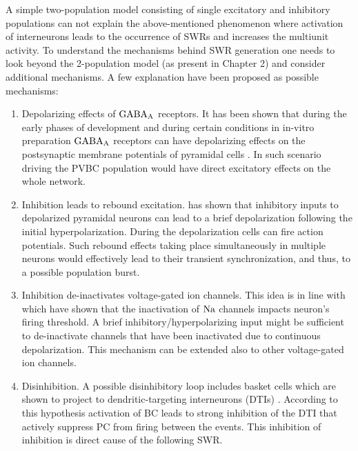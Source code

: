     A simple two-population model consisting of single excitatory and
    inhibitory populations can not explain the above-mentioned phenomenon where
    activation of interneurons leads to the occurrence of SWRs and increases
    the multiunit activity. To understand the mechanisms behind SWR generation
    one needs to look beyond the 2-population model (as present in Chapter 2)
    and consider additional mechanisms. A few explanation have been proposed as
    possible mechanisms:
    \begin{enumerate}
      \item Depolarizing effects of $\rm GABA_A$ receptors. It has been shown
        that during the early phases of development and during certain
        conditions in in-vitro preparation $\rm GABA_A$ receptors can have
        depolarizing effects on the postsynaptic membrane potentials of
        pyramidal cells \citep{Cohen2002, Gulledge2003, Banke2006,
        Szabadics2006}. In such scenario driving the PVBC population would have
        direct excitatory effects on the whole network.
      \item Inhibition leads to rebound excitation. \cite{Cobb95} has shown
        that inhibitory inputs to depolarized pyramidal neurons can lead to a
        brief depolarization following the initial hyperpolarization. During
        the depolarization cells can fire action potentials. Such rebound
        effects taking place simultaneously in multiple neurons would
        effectively lead to their transient synchronization, and thus, to a
        possible population burst.
      \item Inhibition de-inactivates voltage-gated ion channels.
        This idea is in line with \cite{Platkiewicz2011} which have shown that
        the inactivation of $\rm Na$ channels impacts neuron's firing threshold. A
        brief inhibitory/hyperpolarizing input might be sufficient to
        de-inactivate channels that have been inactivated due to continuous
        depolarization. This mechanism can be extended also to other
        voltage-gated ion channels. 
      \item Disinhibition. A possible disinhibitory loop includes basket cells
        which are shown to project to dendritic-targeting interneurons (DTIs)
        \citep{Cobb97, Kohus2016}. According to this hypothesis activation of
        BC leads to strong inhibition of the DTI that actively suppress PC from
        firing between the events. This inhibition of inhibition is direct
        cause of the following SWR.
    \end{enumerate}
    
